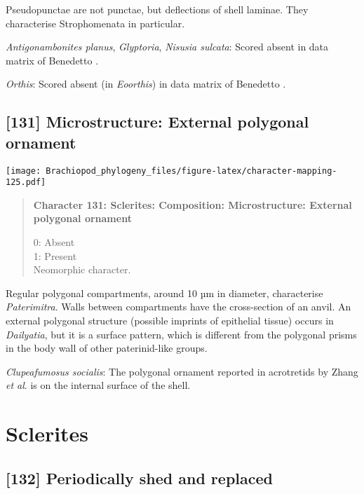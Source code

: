 \documentclass[openany]{book}
\theoremstyle{definition}
\theoremstyle{definition}
\theoremstyle{definition}
\theoremstyle{remark}
\begin{document}
Pseudopunctae are not punctae, but deflections of shell laminae. They
characterise Strophomenata in particular.

\hypertarget{Antigonambonites_planus-coding-130}{}
\emph{Antigonambonites planus}, \emph{Glyptoria}, \emph{Nisusia
sulcata}: Scored absent in data matrix of Benedetto
\citeyearpar{Benedetto2009iChaniella}.

\hypertarget{Orthis-coding-130}{}
\emph{Orthis}: Scored absent (in \emph{Eoorthis}) in data matrix of
Benedetto \citeyearpar{Benedetto2009iChaniella}.

\subsection*{{[}131{]} Microstructure: External polygonal
ornament}\label{microstructure-external-polygonal-ornament}

\texttt{[image: Brachiopod\_phylogeny\_files/figure-latex/character-mapping-125.pdf]}

\begin{quote}
\textbf{Character 131: Sclerites: Composition: Microstructure: External
polygonal ornament}

0: Absent\\
1: Present\\
Neomorphic character.
\end{quote}

Regular polygonal compartments, around 10 µm in diameter, characterise
\emph{Paterimitra}. Walls between compartments have the cross-section of
an anvil. An external polygonal structure (possible imprints of
epithelial tissue) occurs in \emph{Dailyatia}, but it is a surface
pattern, which is different from the polygonal prisms in the body wall
of other paterinid-like groups.

\hypertarget{Clupeafumosus_socialis-coding-131}{}
\emph{Clupeafumosus socialis}: The polygonal ornament reported in
acrotretids by Zhang \emph{et al}. \citeyearpar{Zhang2016Epithelialcell}
is on the internal surface of the shell.

\section{Sclerites}\label{sclerites-1}

\subsection*{{[}132{]} Periodically shed and
replaced}\label{periodically-shed-and-replaced}
\end{document}
